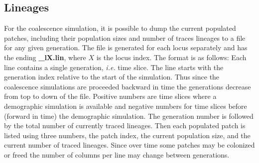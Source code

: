 \documentclass[letterpaper,12pt,oneside]{book}
\begin{document}
\subsection{Lineages}\label{coalLineages}
For the coalescence simulation, it is possible to dump the current populated patches, including their population sizes and number of traces lineages to a file for any given generation. The file is generated for each locus separately and has the ending \textbf{\_lX.lin}, where $X$ is the locus index. The format is as follows: Each line contains a single generation, \textit{i.e.} time slice. The line starts with the generation index relative to the start of the simulation. Thus since the coalescence simulations are proceeded backward in time the generations decrease from top to down of the file. Positive numbers are time slices where a demographic simulation is available and negative numbers for time slices before (forward in time) the demographic simulation. The generation number is followed by the total number of currently traced lineages. Then each populated patch is listed using three numbers, the patch index, the current population size, and the current number of traced lineages. Since over time some patches may be colonized or freed the number of columns per line may change between generations.
\end{document}
